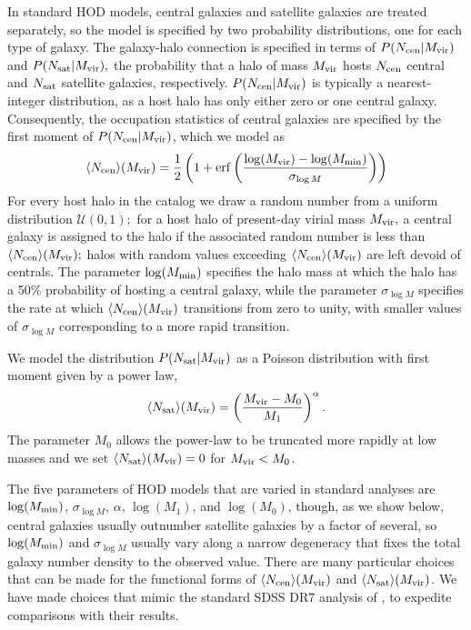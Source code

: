\documentclass[usenatbib,usegraphicx,letterpaper]{mn2e}
\newcommand{\mvir}{M_{\rm vir}}
\newcommand{\ncen}{N_{\rm cen}}
\newcommand{\nsat}{N_{\rm sat}}
\begin{document}
In standard HOD models, central galaxies and satellite galaxies are treated separately, so
the model is specified by two probability distributions, one for each type of galaxy.
The galaxy-halo connection is specified in terms of $P(\ncen|\mvir)$ and $P(\nsat|\mvir),$
the probability that a halo of mass $\mvir$ hosts $\ncen$ central and $\nsat$ satellite galaxies,
respectively. $P(\ncen|\mvir)$ is typically a nearest-integer distribution, as a host halo has only
either zero or one central galaxy. Consequently, the occupation statistics of central galaxies are
specified by the first moment of $P(\ncen|\mvir)$, which we model as
%
\begin{equation}
\label{eq:ncen}
\langle N_{\mathrm{cen}} \rangle(\mvir) =
        \frac{1}{2}\left( 1 +
        \mathrm{erf}\left( \frac{\log (\mvir) -
        \log (M_{\rm min})}{\sigma_{\log M}} \right) \right)
\end{equation}
%
For every host halo in the catalog we draw a random number from a uniform distribution $\mathcal{U}(0, 1);$ for a host halo of present-day virial mass $\mvir,$ a central galaxy is assigned to the halo if the associated random number is less than $\langle N_{\mathrm{cen}} \rangle(\mvir);$ halos with random values exceeding  $\langle N_{\mathrm{cen}} \rangle(\mvir)$ are left devoid of centrals.
The parameter $\log (M_{\rm min})$ specifies the halo mass at which the halo has a 50\% probability of hosting a
central galaxy, while the parameter $\sigma_{\log M}$ specifies the rate at which $\langle N_{\mathrm{cen}} \rangle (\mvir)$
transitions from zero to unity, with smaller values of $\sigma_{\log M}$ corresponding to a more rapid transition.


We model the distribution $P(\nsat|\mvir)$ as a Poisson distribution with first moment given by a power law,
%
\begin{equation}
\label{eq:nsat}
\langle N_{\rm sat}\rangle(\mvir) = \left( \frac{\mvir - M_0}{M_1} \right)^{\alpha}.
\end{equation}
%
The parameter $M_0$ allows the power-law to be truncated more rapidly at low masses and we
set $\langle N_{\rm sat}\rangle (\mvir) = 0$ for $\mvir < M_0$.


The five parameters of HOD models that are varied in standard analyses are $\log (M_{\rm min})$,
$\sigma_{\log M}$, $\alpha$, $\log (M_1)$, and $\log (M_0)$, though, as we show below, central galaxies usually
outnumber satellite galaxies by a factor of several, so $\log (M_{\rm min})$ and $\sigma_{\log M}$ usually
vary along a narrow degeneracy that fixes the total galaxy number density to the observed value. There are
many particular choices that can be made for the functional forms of $\langle N_{\rm cen}\rangle (\mvir)$ and
$\langle N_{\rm sat}\rangle (\mvir)$. We have made choices that mimic the standard SDSS DR7 analysis of
\citet{zehavi_etal11}, to expedite comparisons with their results.
\end{document}

